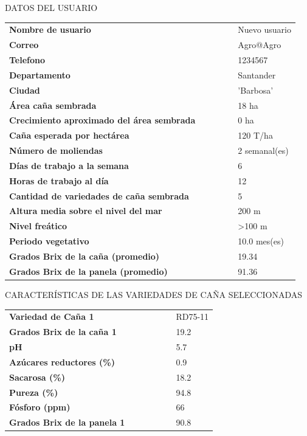 \documentclass{article}%
\begin{document}
\newpage%
\begin{center}%
\begin{Huge}%
DATOS DEL USUARIO%
\end{Huge}%
\linebreak%
\end{center}%
\begin{tabular}{lccccl}%
\textbf{Nombre de usuario}& & & & &Nuevo usuario\\%
\textbf{Correo}& & & & &Agro@Agro\\%
\textbf{Telefono}& & & & &1234567\\%
\textbf{Departamento}& & & & &Santander\\%
\textbf{Ciudad}& & & & & 'Barbosa'\\%
\textbf{Área caña sembrada}& & & & &18 ha\\%
\textbf{Crecimiento aproximado del área sembrada}& & & & &0 ha\\%
\textbf{Caña esperada por hectárea}& & & & &120 T/ha\\%
\textbf{Número de moliendas}& & & & &2 semanal(es)\\%
\textbf{Días de trabajo a la semana}& & & & &6\\%
\textbf{Horas de trabajo al día}& & & & &12\\%
\textbf{Cantidad de variedades de caña sembrada}& & & & &5\\%
\textbf{Altura media sobre el nivel del mar}& & & & &200 m\\%
\textbf{Nivel freático}& & & & &>100 m\\%
\textbf{Periodo vegetativo}& & & & &10.0 mes(es)\\%
\textbf{Grados Brix de la caña (promedio)}& & & & &19.34\\%
\textbf{Grados Brix de la panela (promedio)}& & & & &91.36\\%
\end{tabular}%
\newpage%
\begin{center}%
\begin{Huge}%
CARACTERÍSTICAS DE LAS VARIEDADES DE CAÑA SELECCIONADAS%
\end{Huge}%
\linebreak%
\end{center}%
\begin{tabular}{lcccccl}%
\textbf{Variedad de Caña 1}& & & & & &RD75{-}11\\%
\textbf{Grados Brix de la caña 1}& & & & & &19.2\\%
\textbf{pH}& & & & & &5.7\\%
\textbf{Azúcares reductores (\%)}& & & & & &0.9\\%
\textbf{Sacarosa (\%)}& & & & & &18.2\\%
\textbf{Pureza (\%)}& & & & & &94.8\\%
\textbf{Fósforo (ppm)}& & & & & &66\\%
\textbf{Grados Brix de la panela 1}& & & & & &90.8\\%
\end{tabular}%
\end{document}
